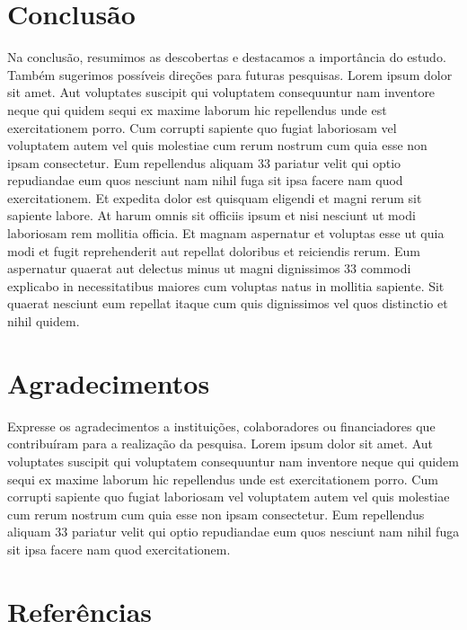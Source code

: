 \documentclass[12pt]{article}
\begin{document}
\section{Conclusão} %
Na conclusão, resumimos as descobertas e destacamos a importância do estudo. Também sugerimos possíveis direções para futuras pesquisas. Lorem ipsum dolor sit amet. Aut voluptates suscipit qui voluptatem consequuntur nam inventore neque qui quidem sequi ex maxime laborum hic repellendus unde est exercitationem porro. Cum corrupti sapiente quo fugiat laboriosam vel voluptatem autem vel quis molestiae cum rerum nostrum cum quia esse non ipsam consectetur. Eum repellendus aliquam 33 pariatur velit qui optio repudiandae eum quos nesciunt nam nihil fuga sit ipsa facere nam quod exercitationem. Et expedita dolor est quisquam eligendi et magni rerum sit sapiente labore. At harum omnis sit officiis ipsum et nisi nesciunt ut modi laboriosam rem mollitia officia. Et magnam aspernatur et voluptas esse ut quia modi et fugit reprehenderit aut repellat doloribus et reiciendis rerum. Eum aspernatur quaerat aut delectus minus ut magni dignissimos 33 commodi explicabo in necessitatibus maiores cum voluptas natus in mollitia sapiente. Sit quaerat nesciunt eum repellat itaque cum quis dignissimos vel quos distinctio et nihil quidem.
\section{Agradecimentos} %
Expresse os agradecimentos a instituições, colaboradores ou financiadores que contribuíram para a realização da pesquisa. Lorem ipsum dolor sit amet. Aut voluptates suscipit qui voluptatem consequuntur nam inventore neque qui quidem sequi ex maxime laborum hic repellendus unde est exercitationem porro. Cum corrupti sapiente quo fugiat laboriosam vel voluptatem autem vel quis molestiae cum rerum nostrum cum quia esse non ipsam consectetur. Eum repellendus aliquam 33 pariatur velit qui optio repudiandae eum quos nesciunt nam nihil fuga sit ipsa facere nam quod exercitationem. 
\section*{Referências} %
\printbibliography[heading=none] %
\end{document}
